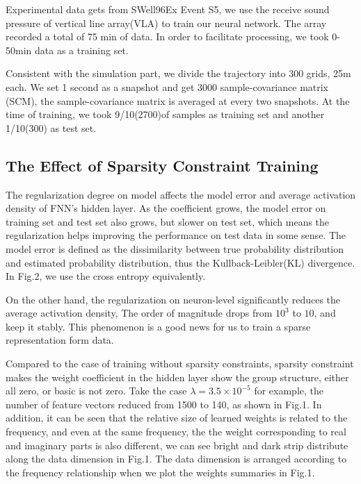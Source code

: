 Experimental data gets from SWell96Ex Event S5, we use the receive sound pressure of vertical line array(VLA) to train our neural network. The array recorded a total of 75 min of data. In order to facilitate processing, we took 0\--50min data as a training set.

Consistent with the simulation part, we divide the trajectory into 300 grids, 25m each. We set 1 second as a snapshot and get 3000 sample-covariance matrix (SCM), the sample-covariance matrix is averaged at every two snapshots.
At the time of training, we took 9/10(2700)of samples as training set and another 1/10(300) as test set.

\subsection{The Effect of Sparsity Constraint Training}
The regularization degree on model affects the model error and average activation density of FNN's hidden layer. As the coefficient grows, the model error on training set and test set also grows, but slower on test set, which means
the regularization helps improving the performance on test data in some sense. The model error is defined as the dissimilarity between true probability distribution and estimated probability distribution, thus the Kullback-Leibler(KL) divergence.
In Fig.2, we use the cross entropy equivalently.

On the other hand, the regularization on neuron-level significantly reduces the average activation density,
The order of magnitude drops from $10^{3}$ to $10$, and keep it stably. This phenomenon is a good news for
us to train a sparse representation form data.

Compared to the case of training without sparsity constraints, sparsity constraint makes the weight coefficient in the hidden layer show the group structure, either all zero, or basic is not zero. Take the case $\lambda=3.5 \times 10^{-5} $
for example, the number of feature vectors reduced from 1500 to 140, as shown in Fig.1. In addition, it can be seen that the relative size of learned weights is related to the frequency, and even at the same frequency, the the weight corresponding
to real and imaginary parts is also different, we can see bright and dark strip distribute along the data dimension in Fig.1. The data dimension is arranged according to the frequency relationship when we plot the weights summaries in Fig.1.

